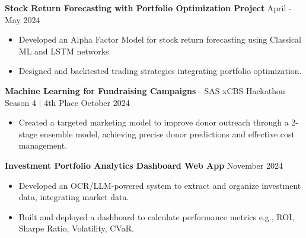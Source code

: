 \documentclass[a4paper,11pt]{article}
\begin{document}
\vspace{3pt}

\textbf{Stock Return Forecasting with Portfolio Optimization Project} \hfill April - May 2024
\begin{itemize}[noitemsep, topsep=0pt, partopsep=0pt, parsep=0pt]
    \item Developed an Alpha Factor Model for stock return forecasting using Classical ML and LSTM networks.
    \item Designed and backtested trading strategies integrating portfolio optimization.
\end{itemize}

\vspace{3pt}

\textbf{Machine Learning for Fundraising Campaigns} - SAS xCBS Hackathon Season 4 | 4th Place \hfill October 2024
\begin{itemize}[noitemsep, topsep=0pt, partopsep=0pt, parsep=0pt]
    \item Created a targeted marketing model to improve donor outreach through a 2-stage ensemble model, achieving precise donor predictions and effective cost management.
\end{itemize}

\vspace{3pt}

\textbf{Investment Portfolio Analytics Dashboard Web App} \hfill November 2024
\begin{itemize}[noitemsep, topsep=0pt, partopsep=0pt, parsep=0pt]
    \item Developed an OCR/LLM-powered system to extract and organize investment data, integrating market data.
    \item Built and deployed a dashboard to calculate performance metrics e.g., ROI, Sharpe Ratio, Volatility, CVaR.
\end{itemize}

\vspace{3pt}
\end{document}
